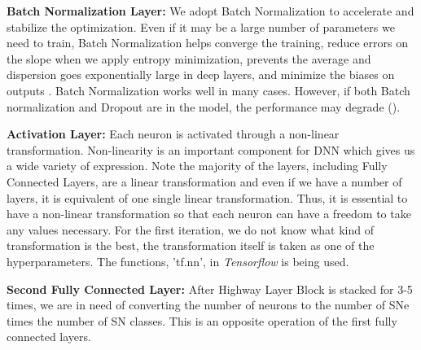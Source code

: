 \documentclass[useamsfonts]{pasj01}
\begin{document}
{\bf Batch Normalization Layer:}
We adopt Batch Normalization \citep{batch_norm} to accelerate and stabilize the optimization.  Even if it may be a large number of parameters we need to train, Batch Normalization helps converge the training, reduce errors on the slope when we apply entropy minimization, prevents the average and dispersion goes exponentially large in deep layers, and minimize the biases on outputs \citep{understanding_batch_norm}.
Batch Normalization works well in many cases. However, if both Batch normalization and Dropout are in the model, the performance may degrade (\cite{dropout_and_batch_norm}).   

{\bf Activation Layer:}
Each neuron is activated through a non-linear transformation.  Non-linearity is an important component for DNN which gives us a wide variety of expression.   Note the majority of the layers, including Fully Connected Layers, are a linear transformation and even if we have a number of layers, it is equivalent of one single linear transformation.   Thus, it is essential to have a non-linear transformation so that each neuron can have a freedom to take any values necessary.
For the first iteration, we do not know what kind of transformation is the best, the transformation itself is taken as one of the hyperparameters.  The functions, 'tf.nn', in {\it Tensorflow} is being used.

{\bf Second Fully Connected Layer:}
After Highway Layer Block is stacked for 3-5 times, we are in need of converting the number of neurons to the number of SNe times the number of SN classes.   This is an opposite operation of the first fully connected layers.
\end{document}
